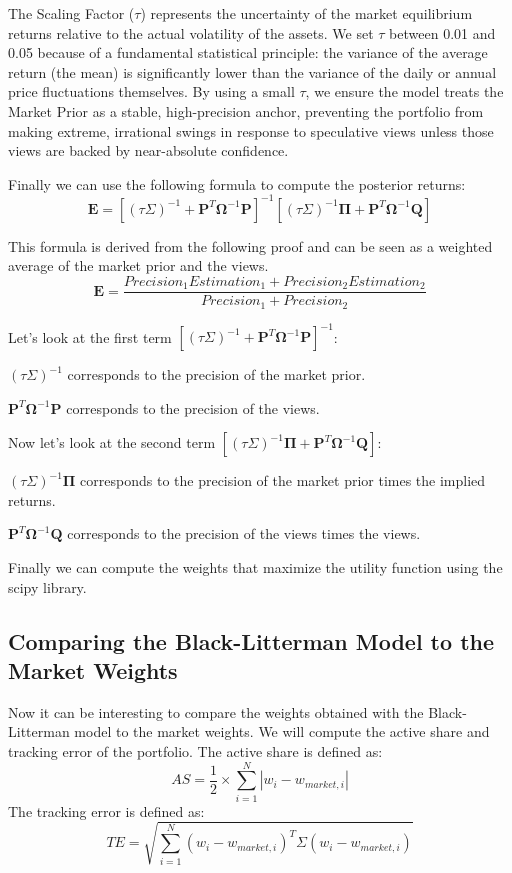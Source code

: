 \documentclass[11pt,a4paper]{article}
\begin{document}
The Scaling Factor ($\tau$) represents the uncertainty of the market equilibrium returns relative to the actual volatility 
of the assets. We set $\tau$ between 0.01 and 0.05 because of a fundamental statistical principle: the variance of the average 
return (the mean) is significantly lower than the variance of the daily or annual price fluctuations themselves. 
By using a small $\tau$, we ensure the model treats the Market Prior as a stable, high-precision anchor, preventing the portfolio from making extreme, 
irrational swings in response to speculative views unless those views are backed by near-absolute confidence.

Finally we can use the following formula to compute the posterior returns:
\begin{equation}
    \mathbf{E} = \left[ (\tau \Sigma)^{-1} + \mathbf{P}^T \mathbf{\Omega}^{-1} \mathbf{P} \right]^{-1} \left[ (\tau \Sigma)^{-1} \bm{\Pi} + \mathbf{P}^T \mathbf{\Omega}^{-1} \mathbf{Q} \right]
\end{equation}

This formula is derived from the following proof and can be seen as a weighted average of the market prior and the views.
\begin{equation}
    \mathbf{E} = \frac{Precision_1 Estimation_1 + Precision_2 Estimation_2}{Precision_1 + Precision_2}
\end{equation}

Let's look at the first term $\left[ (\tau \Sigma)^{-1} + \mathbf{P}^T \mathbf{\Omega}^{-1} \mathbf{P} \right]^{-1}$:

$(\tau \Sigma)^{-1}$ corresponds to the precision of the market prior.

$\mathbf{P}^T \mathbf{\Omega}^{-1} \mathbf{P}$ corresponds to the precision of the views.

Now let's look at the second term $\left[ (\tau \Sigma)^{-1} \bm{\Pi} + \mathbf{P}^T \mathbf{\Omega}^{-1} \mathbf{Q} \right]$:

$(\tau \Sigma)^{-1} \bm{\Pi}$ corresponds to the precision of the market prior times the implied returns.

$\mathbf{P}^T \mathbf{\Omega}^{-1} \mathbf{Q}$ corresponds to the precision of the views times the views.

Finally we can compute the weights that maximize the utility function using the scipy library.
\subsection{Comparing the Black-Litterman Model to the Market Weights}
Now it can be interesting to compare the weights obtained with the Black-Litterman model to the market weights.
We will compute the active share and tracking error of the portfolio.
The active share is defined as:
\begin{equation}
    AS = \frac{1}{2} \times \sum_{i=1}^N |w_i - w_{market,i}|
\end{equation}
The tracking error is defined as:
\begin{equation}
    TE = \sqrt{\sum_{i=1}^N (w_i - w_{market,i})^T  \Sigma  (w_i - w_{market,i})}
\end{equation}
\end{document}
